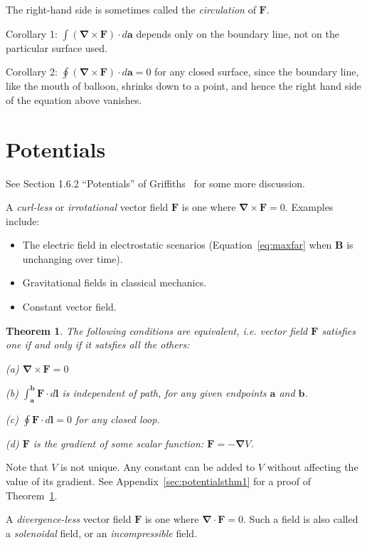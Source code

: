 \documentclass[a4paper]{article}
\theoremstyle{plain}
\newtheorem{theorem}{Theorem}
\theoremstyle{definition}
\newcommand{\vect}[1]{\textbf{#1}}
\newcommand{\del}{\bm{\nabla}}
\begin{document}
The right-hand side is sometimes called the {\em circulation} of
$\vect{F}$.

Corollary 1: $\int (\del \times \vect{F}) \cdot d\vect{a}$ depends
only on the boundary line, not on the particular surface used.

Corollary 2: $\oint (\del \times \vect{F}) \cdot d\vect{a} = 0$ for
any closed surface, since the boundary line, like the mouth of
balloon, shrinks down to a point, and hence the right hand side of the
equation above vanishes.


\section{Potentials}
\label{sec:potentials}

See Section 1.6.2 ``Potentials'' of Griffiths~\cite{Griffiths1998} for
some more discussion.

A {\em curl-less} or {\em irrotational} vector field $\vect{F}$ is one
where $\del \times \vect{F} = 0$.
Examples include:
\begin{itemize}
\item The electric field in electrostatic scenarios
  (Equation~\eqref{eq:maxfar} when $\vect{B}$ is unchanging over
  time).
\item Gravitational fields in classical mechanics.
\item Constant vector field.
\end{itemize}

\begin{theorem}
\label{thm:irrotationalfieldproperties}
The following conditions are equivalent, i.e. vector field $\vect{F}$
satisfies one if and only if it satsfies all the others:

(a) $\del \times \vect{F} = 0$

(b) $\int_{\vect{a}}^{\vect{b}} \vect{F} \cdot d\vect{l}$ is
independent of path, for any given endpoints $\vect{a}$ and
$\vect{b}$.

(c) $\oint \vect{F} \cdot d\vect{l} = 0$ for any closed loop.

(d) $\vect{F}$ is the gradient of some scalar function:
$\vect{F} = -\del V$.
\end{theorem}

Note that $V$ is not unique.  Any constant can be added to $V$ without
affecting the value of its gradient.
See Appendix~\ref{sec:potentialsthm1} for a proof of
Theorem~\ref{thm:irrotationalfieldproperties}.

A {\em divergence-less} vector field $\vect{F}$ is one where
$\del \cdot \vect{F} = 0$.
Such a field is also called a {\em solenoidal} field,
or an {\em incompressible} field.
\end{document}
